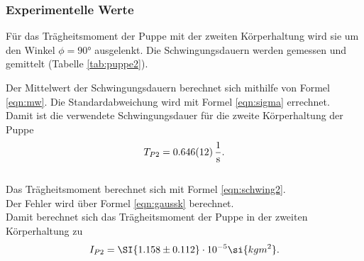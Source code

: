 \subsubsection{Experimentelle Werte}
Für das Trägheitsmoment der Puppe mit der zweiten Körperhaltung wird sie um den Winkel $\phi=90°$ ausgelenkt.
Die Schwingungsdauern werden gemessen und gemittelt (Tabelle \ref{tab:puppe2}).

Der Mittelwert der Schwingungsdauern berechnet sich mithilfe von Formel \eqref{eqn:mw}.
Die Standardabweichung wird mit Formel \eqref{eqn:sigma} errechnet.
\\Damit ist die verwendete Schwingungsdauer für die zweite Körperhaltung der Puppe
\begin{equation*}
  T_{P2}= \SI{0.646 \pm 0.012}{\frac{1}{s}}.
\end{equation*}
\\Das Trägheitsmoment berechnet sich mit Formel \eqref{eqn:schwing2}.
\\Der Fehler wird über Formel \eqref{eqn:gaussk} berechnet.
\\Damit berechnet sich das Trägheitsmoment der Puppe in der zweiten Körperhaltung zu
\begin{equation*}
  I_{P2}= \SI{1.158 \pm 0.112} \cdot 10^{-5} \si{kg m^2}.
\end{equation*}
